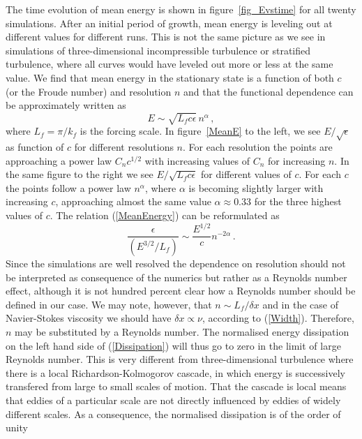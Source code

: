 \documentclass{jfm}
\begin{document}
The time evolution of mean energy is shown in figure~\ref{fig_Evstime} for all
twenty simulations. After an initial period of growth, mean energy is leveling
out at different values for different runs. This is not the same picture as we
see in simulations of three-dimensional incompressible turbulence or stratified
turbulence, where all curves would have leveled out more or less at the same
value. We find that mean energy in the stationary state is a function of both $
c $ (or the Froude number) and resolution $ n $ and that the functional
dependence can be approximately written as
\begin{equation} \label{MeanEnergy}
E \sim \sqrt{L_f c \epsilon} \, n^{\alpha}  \, ,
\end{equation}
where $ L_f = \pi/k_f $ is the forcing scale. In figure~\ref{MeanE} to the
left, we see $ E/\sqrt{\epsilon} $ as function of $ c $ for different resolutions $
n $. For each resolution the points are approaching a power law $ C_n c^{1/2} $
with increasing values of $ C_n $ for increasing $ n $. In the same figure to
the right we see $ E/\sqrt{L_f c \epsilon} $ for different values of $ c $. For
each $ c $ the points follow a power law $ n^{\alpha} $, where $ \alpha $ is
becoming slightly larger with increasing $ c $, approaching almost the same
value $ \alpha \approx 0.33 $ for the three highest values of $ c $. The
relation (\ref{MeanEnergy}) can be reformulated as
\begin{equation} \label{Dissipation}
\frac{\epsilon} {(E^{3/2} / L_f)} \sim \frac{E^{1/2}}{c} n^{-2\alpha} \, .
\end{equation}
Since the simulations are well resolved the dependence on resolution should not
be interpreted as consequence of the numerics but rather as a Reynolds number
effect, although it is not hundred percent clear how a Reynolds number should
be defined in our case. We may note, however, that $ n \sim L_f/\delta x $ and in the case of Navier-Stokes viscosity
 we should have $ \delta x \propto \nu $, according to (\ref{Width}). Therefore,  $ n $ may be substituted by a Reynolds number. The normalised energy dissipation on the left hand side of
(\ref{Dissipation}) will thus go to zero in the limit of large Reynolds number.
This is very different from three-dimensional turbulence where there is a local
Richardson-Kolmogorov cascade, in which energy is successively transfered from
large to small scales of motion. That the cascade is local means that eddies of
a particular scale are not directly influenced by eddies of widely different
scales. As a consequence, the normalised dissipation is of the order of unity
\end{document}

